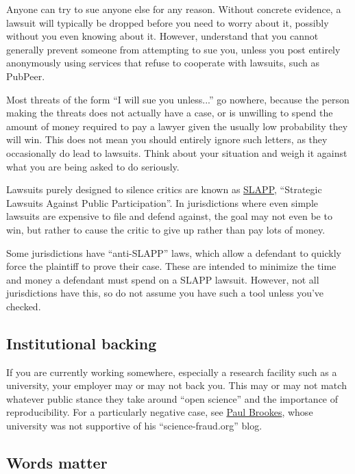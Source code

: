 \documentclass[letterpaper, 12pt]{article}
\begin{document}
Anyone can try to sue anyone else for any reason.
Without concrete evidence, a lawsuit will typically be dropped before you need to worry about it, possibly without you even knowing about it.
However, understand that you cannot generally prevent someone from attempting to sue you, unless you post entirely anonymously using services that refuse to cooperate with lawsuits, such as PubPeer.

Most threats of the form ``I will sue you unless...'' go nowhere, because the person making the threats does not actually have a case, or is unwilling to spend the amount of money required to pay a lawyer given the usually low probability they will win.
This does not mean you should entirely ignore such letters, as they occasionally do lead to lawsuits.
Think about your situation and weigh it against what you are being asked to do seriously.

Lawsuits purely designed to silence critics are known as \href{https://en.wikipedia.org/wiki/Strategic_lawsuit_against_public_participation}{SLAPP},
``Strategic Lawsuits Against Public Participation''.
In jurisdictions where even simple lawsuits are expensive to file and defend against, the goal may not even be to win, but rather to cause the critic to give up rather than pay lots of money.

Some jurisdictions have ``anti-SLAPP'' laws, which allow a defendant to quickly force the plaintiff to prove their case. These are intended to minimize the time and money a defendant must spend on a SLAPP lawsuit. However, not all jurisdictions have this, so do not assume you have such a tool unless you've checked.

\subsection*{Institutional backing}

If you are currently working somewhere, especially a research facility such as a university, your employer may or may not back you.
This may or may not match whatever public stance they take around ``open science'' and the importance of reproducibility.
For a particularly negative case, see \href{https://www.science.org/content/article/paul-brookes-surviving-outed-whistleblower}{Paul Brookes}, whose university was not supportive of his ``science-fraud.org'' blog.

\subsection*{Words matter}
\end{document}
